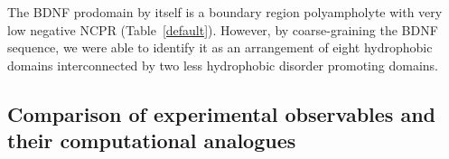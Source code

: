 \documentclass[journal=jacsat,manuscript=article]{achemso}
\begin{document}
The BDNF prodomain by itself is a boundary region polyampholyte with very low negative NCPR (Table~\ref{default}). However, by coarse-graining the BDNF sequence, we were able to identify it as an arrangement of eight hydrophobic domains interconnected by two less hydrophobic disorder promoting domains.



\subsection{Comparison of experimental observables and their computational analogues}
\end{document}
